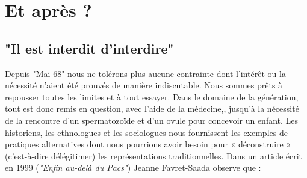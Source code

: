 


 \chapter[Et après ?]{Et après ?}


\section{"Il est interdit d'interdire"} 

  Depuis "Mai 68" nous ne tolérons plus aucune contrainte dont l'intérêt ou la nécessité n’aient été prouvés de manière indiscutable. Nous sommes prêts à repousser toutes les limites et à tout essayer. Dans le domaine de la génération, tout est donc remis en question, avec l'aide de la médecine,, jusqu'à la nécessité de la rencontre d'un spermatozoïde et d'un ovule pour concevoir un enfant. Les historiens, les ethnologues et les sociologues nous fournissent les exemples de pratiques alternatives dont nous pourrions avoir besoin pour « déconstruire » (c'est-à-dire délégitimer) les représentations traditionnelles. Dans un article écrit en 1999 (\emph{"Enfin au-delà du Pacs"}) Jeanne Favret-Saada observe que :
